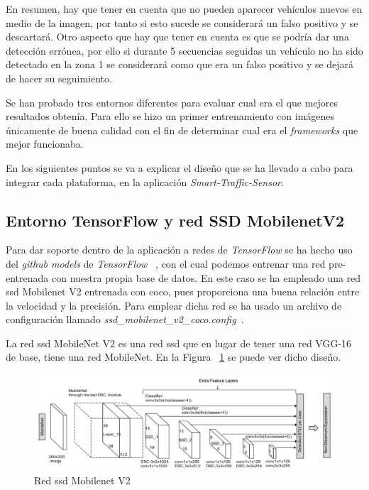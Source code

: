 En resumen, hay que tener en cuenta que no pueden aparecer vehículos nuevos en medio de la imagen, por tanto si esto sucede se considerará un falso positivo y se descartará. Otro aspecto que hay que tener en cuenta es que se podría dar una detección errónea, por ello si durante 5 secuencias seguidas un vehículo no ha sido detectado en la zona 1 se considerará como que era un falso positivo y se dejará de hacer su seguimiento.

Se han probado tres entornos diferentes para evaluar cual era el que mejores resultados obtenía. Para ello se hizo un primer entrenamiento con imágenes únicamente de buena calidad con el fin de determinar cual era el \textit{frameworks} que mejor funcionaba.


En los siguientes puntos se va a explicar el diseño que se ha llevado a cabo para integrar cada plataforma, en la aplicación \textit{Smart-Traffic-Sensor}.

\subsection{Entorno TensorFlow y red SSD MobilenetV2}\label{sub.tensorflow}

Para dar soporte dentro de la aplicación a redes de \textit{TensorFlow} se ha hecho uso del \textit{github models} de \textit{TensorFlow} ~\cite{tensorflow_models}, con el cual podemos entrenar una red pre-entrenada con nuestra propia base de datos. En este caso se ha empleado una red \acrfull{ssd} Mobilenet V2 entrenada con \acrshort{coco}, pues proporciona una buena relación entre la velocidad y la precisión. Para emplear dicha red se ha usado un archivo de configuración llamado \textit{ssd\_mobilenet\_v2\_coco.config}~\cite{ssd_mobilenetv2_config}.

La red \acrshort{ssd} MobileNet V2 es una red \acrshort{ssd} que en lugar de tener una red VGG-16 de base, tiene una red MobileNet. En la Figura ~\ref{fig.ssd_mobilenet} se puede ver dicho diseño.

\begin{figure}[H] 
\begin{center}
	\includegraphics[width=1\textwidth]{figures/Diseno_global/ssd_mobilenet.png}
   \caption{Red \acrshort{ssd} Mobilenet V2}
	\label{fig.ssd_mobilenet}
\end{center}
\end{figure}

